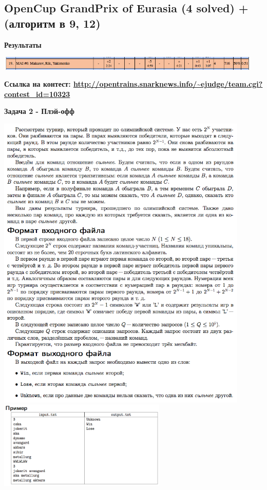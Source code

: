 \documentclass[a4paper,12pt]{article}
\begin{document}
%
%

\newpage
\subsection{OpenCup GrandPrix of Eurasia (4 solved) + (алгоритм в 9, 12)}

\textbf{{\large Результаты}} \\
\begin{center}
\includegraphics[width=0.95\textwidth]{OC_Eurasia/result.png}\\ [1cm]
\end{center}

\textbf{{\large Ссылка на контест: \url{http://opentrains.snarknews.info/~ejudge/team.cgi?contest_id=10323}}}

\newpage
\textbf{{\large Задача 2 - Плэй-офф}}

\begin{center}
\includegraphics[width=0.9\textwidth]{OC_Eurasia/2_1.png}\\ [1cm]
\includegraphics[width=0.6\textwidth]{OC_Eurasia/2_2.png}\\ [1cm]
\end{center}
\end{document}
